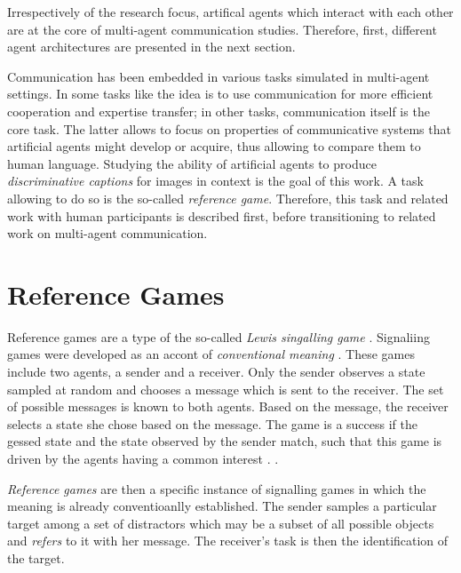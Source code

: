 Irrespectively of the research focus, artifical agents which interact with each other are at the core of multi-agent communication studies. Therefore, first, different agent architectures are presented in the next section.


Communication has been embedded in various tasks simulated in multi-agent settings. In some tasks like  the idea is to use communication for more efficient cooperation and expertise transfer; in other tasks, communication itself is the core task. The latter allows to focus on properties of communicative systems that artificial agents might develop or acquire, thus allowing to compare them to human language. Studying the ability of artificial agents to produce \textit{discriminative captions} for images in context is the goal of this work. A task allowing to do so is the so-called \textit{reference game}. Therefore, this task and related work with human participants is described first, before transitioning to related work on multi-agent communication.


\section{Reference Games}
\label{reference_games}

Reference games are a type of the so-called \textit{Lewis singalling game} \parencite{lewis1969convention, skyrms2010signals}.
Signaliing games were developed as an accont of \textit{conventional meaning} . These games include two agents, a sender and a receiver. Only the sender observes a state sampled at random and chooses a message which is sent to the receiver. The set of possible messages is known to both agents. Based on the message, the receiver selects a state she chose based on the message. The game is a success if the gessed state and the state observed by the sender match, such that this game is driven by the agents having a common interest \parencite{lewis1969convention, franke2016evolution}. . 

\textit{Reference games} are then a specific instance of signalling games in which the meaning is already conventioanlly established. The sender samples a particular target among a set of distractors which may be a subset of all possible objects and \textit{refers} to it with her message. The receiver's task is then the identification of the target. 

